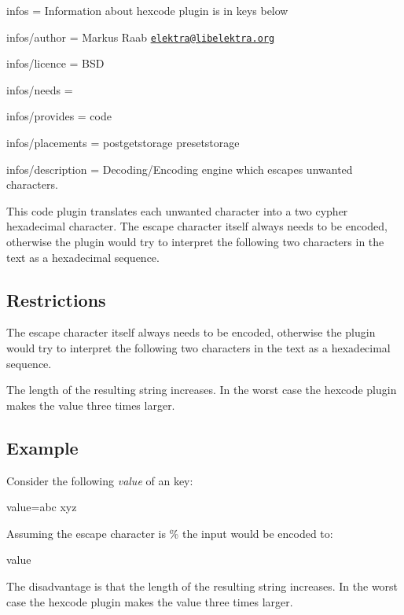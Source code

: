 
\begin{DoxyItemize}
\item infos = Information about hexcode plugin is in keys below
\item infos/author = Markus Raab \href{mailto:elektra@libelektra.org}{\tt elektra@libelektra.\+org}
\item infos/licence = B\+S\+D
\item infos/needs =
\item infos/provides = code
\item infos/placements = postgetstorage presetstorage
\item infos/description = Decoding/\+Encoding engine which escapes unwanted characters.
\end{DoxyItemize}

This code plugin translates each unwanted character into a two cypher hexadecimal character. The escape character itself always needs to be encoded, otherwise the plugin would try to interpret the following two characters in the text as a hexadecimal sequence.

\subsection*{Restrictions}


\begin{DoxyItemize}
\item The escape character itself always needs to be encoded, otherwise the plugin would try to interpret the following two characters in the text as a hexadecimal sequence.
\item The length of the resulting string increases. In the worst case the hexcode plugin makes the value three times larger.
\end{DoxyItemize}

\subsection*{Example}

Consider the following {\itshape value} of an key\+: \begin{DoxyVerb}    value=abc xyz
\end{DoxyVerb}


Assuming the escape character is \% the input would be encoded to\+: \begin{DoxyVerb}    value%
\end{DoxyVerb}


The disadvantage is that the length of the resulting string increases. In the worst case the hexcode plugin makes the value three times larger.

